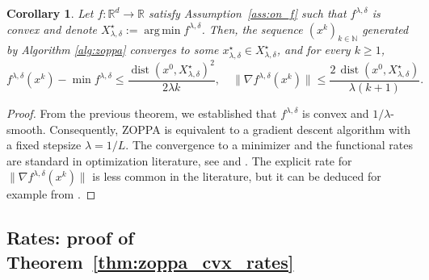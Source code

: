 \documentclass{article}
\newtheorem{corollary}{Corollary}
\newcommand{\dist}{\ensuremath{\operatorname{dist}}}
\DeclareMathOperator*{\argmin}{arg\,min}
\begin{document}
\begin{corollary}
  Let $f:\mathbb{R}^d\to\mathbb{R}$ satisfy Assumption~\ref{ass:on_f} such that $f^{\lambda,\delta}$ is convex and denote $X^\star_{\lambda,\delta}:=\argmin f^{\lambda,\delta}$. Then, the sequence $(x^k)_{k\in\mathbb{N}}$ generated by Algorithm \ref{alg:zoppa} converges to some $x^\star_{\lambda,\delta}\in X_{\lambda,\delta}^{\star}$, and for every $k\ge1$,
\begin{equation}\label{eq:GDrates_app}
    f^{\lambda,\delta}(x^k)-\min f^{\lambda,\delta}
\le
\frac{\dist(x^0,X_{\lambda,\delta}^{\star})^2}{2\lambda k}, \quad \|\nabla f^{\lambda,\delta}(x^k)\|
\le
\frac{2\,\dist(x^0,X_{\lambda,\delta}^{\star})}{\lambda(k+1)}.
\end{equation}
\end{corollary}
\begin{proof}
From the previous theorem, we established that $f^{\lambda,\delta}$ is convex and $1/\lambda$-smooth. Consequently, ZOPPA is equivalent to a gradient descent algorithm with a fixed stepsize $\lambda = 1/L$. The convergence to a minimizer and the functional rates are standard in optimization literature, see \cite{Dunn_GD} and \cite[Theorem 10.21]{BeckBook}. The explicit rate for $\|\nabla f^{\lambda,\delta}(x^k)\|$ is less common in the literature, but it can be deduced for example from \cite[Theorem 10.27]{BeckBook}.
\end{proof}

\subsection{Rates: proof of Theorem~\ref{thm:zoppa_cvx_rates}}\label{app:proof_of_zoppa_cvx_rates}
\end{document}
